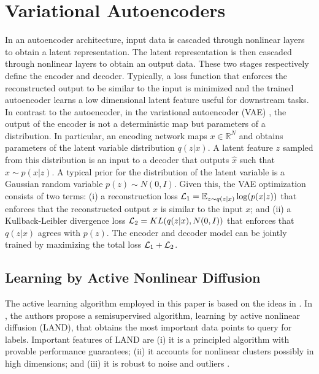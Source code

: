 \documentclass{article}
\def\R{\mathbb{R}}
\def\L{{\cal L}}
\def\L{{\cal L}}
\def\R{{\mathbb R}}
\def\E{{\mathbb E}}
\begin{document}

\section{Variational Autoencoders }
\label{sec:vaes}

In an autoencoder architecture, input data is cascaded through nonlinear layers to obtain a latent representation. The latent representation is then cascaded  through nonlinear layers to obtain an output data. These two stages respectively define the encoder and decoder. Typically, a loss function that enforces the reconstructed output to be similar to the input is minimized and the trained autoencoder learns
a low dimensional latent feature useful for downstream tasks. In contrast to the autoencoder, in the variational autoencoder (VAE) \cite{kingma2014auto}, the output of the encoder is not a deterministic map but parameters of a distribution.  In particular, an encoding network maps $x \in \R^N$ and obtains parameters of the latent variable distribution $q(z|x)$. A latent feature $z$  sampled from this distribution is an input to a decoder that outputs $\hat{x}$ such that $\hat{x}\sim p(x|z)$. A typical prior for the distribution of the latent variable is a Gaussian random variable $p(z)\sim N(0,I)$. Given this, the VAE optimization consists of two terms: (i) a reconstruction loss $\L_1=  \E_{z \sim q(z|x)} \log(p(x|z))$ that enforces that the reconstructed output $\hat{x}$ is similar to the input $x$; and (ii) a Kullback-Leibler divergence loss $\L_2 =  KL(q(z|x),N(0,I))$  that enforces that $q(z|x)$ agrees with $p(z)$. The encoder and decoder model can be jointly trained by maximizing the total loss $\L_1+\L_2$. 

\subsection{Learning by Active Nonlinear Diffusion}



The active learning algorithm employed in this paper is based on the ideas in \cite{Murphy2019_Unsupervised, Maggioni2019_LUND, Murphy2020_Spectral}.  In \cite{Maggioni2019_LAND}, the authors propose a semisupervised algorithm, learning by active nonlinear diffusion (LAND), that obtains the most important data points to query  for labels.  Important features of LAND are (i) it is a principled algorithm with provable performance guarantees; (ii) it accounts for nonlinear clusters possibly in high dimensions; and (iii) it is robust to noise and outliers \cite{Maggioni2019_LAND}.
\end{document}
